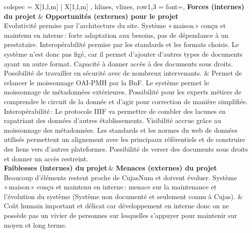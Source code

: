 \begin{table}[H]
	\centering
	\caption{Analyse SWOT du prototype Codex}
	\label{tab:swot_Codex}
	\vspace{0.3cm}
	\begin{tblr}{
			colspec = { X[1,l,m] | X[1,l,m] },
			hlines,
			vlines,
			row{1,3} = {font=\bfseries},%
		}
		\textbf{Forces (internes) du projet} & \textbf{Opportunités (externes) pour le projet} \\
		
		Evolutivité permise par l’architecture du site. 
		Système « maison » conçu et maintenu en interne : forte adaptation aux besoins, pas de dépendance à un prestataire. 
		Interopérabilité permise par les standards et les formats choisis. 
		Le système n’est donc pas figé, car il permet d’ajouter d’autres types de documents ayant un autre format. 
		Capacité à donner accès à des documents sous droits. 
		Possibilité de travailler en sécurité avec de nombreux intervenants.
		&
		Permet de relancer le moissonnage OAI-PMH par la BnF. 
		Le système permet le moissonnage de métadonnées extérieures. 
		Possibilité pour les experts métiers de comprendre le circuit de la donnée et d’agir pour correction de manière simplifiée. 
		Interopérabilité : 
		Le protocole IIIF va permettre de combler des lacunes en rapatriant des données d’autres établissements. 
		Visibilité accrue grâce au moissonnage des métadonnées. 
		Les standards et les normes du web de données utilisés permettent un alignement avec les principaux référentiels et de construire des liens vers d’autres plateformes. 
		Possibilité de verser des documents sous droits et donner un accès restreint.\\
		
		\textbf{Faiblesses (internes) du projet} & \textbf{Menaces (externes) du projet} \\ 
		
		Beaucoup d’éléments restent proche de CujasNum et doivent évoluer. 
		Système « maison » conçu et maintenu en interne : menace sur la maintenance et l’évolution du système (Système non documenté et seulement connu à Cujas). 
		&
		Coût humain important et délicat car développement en interne donc on ne possède pas un vivier de personnes sur lesquelles s’appuyer pour maintenir sur moyen et long terme. \\
		
	\end{tblr}
\end{table}

